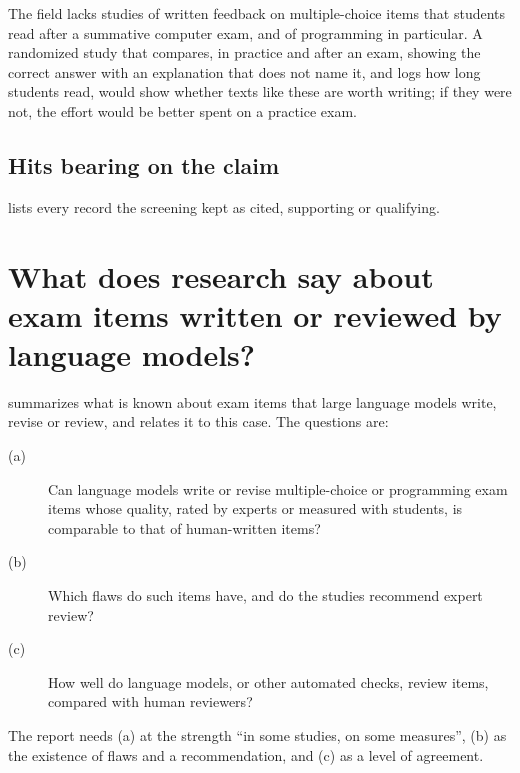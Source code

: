 The field lacks studies of written feedback on multiple-choice items that
students read after a summative computer exam, and of programming in
particular.  A randomized study that compares, in practice and after an
exam, showing the correct answer with an explanation that does not name
it, and logs how long students read, would show whether texts like these
are worth writing; if they were not, the effort would be better spent on a
practice exam.

\section{Hits bearing on the claim}
\label{sec:feedback-hits}

 lists every record the screening kept as cited,
supporting or qualifying.



\chapter{What does research say about exam items written or reviewed by
  language models?}
\label{app:llm-items}

 summarizes what is known about exam items that
large language models write, revise or review, and relates it to this
case.  The questions are:
\begin{description}
  \item[(a)] Can language models write or revise multiple-choice or
    programming exam items whose quality, rated by experts or measured
    with students, is comparable to that of human-written items?
  \item[(b)] Which flaws do such items have, and do the studies recommend
    expert review?
  \item[(c)] How well do language models, or other automated checks,
    review items, compared with human reviewers?
\end{description}
The report needs (a) at the strength \enquote{in some studies, on some
measures}, (b) as the existence of flaws and a recommendation, and (c)
as a level of agreement.

